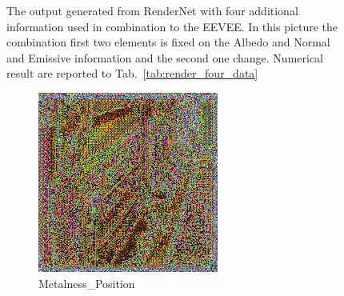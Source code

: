 \begin{figure}[h!]
    \caption{The output generated from RenderNet with four additional information used in combination to the EEVEE. In this picture the combination first two elements is fixed on the Albedo and Normal and Emissive information and the second one change. Numerical result are reported to Tab.~\ref{tab:render_four_data}}
    \label{fig:quadruple_input_base_albedo_normal}
\end{figure}

\begin{figure}[h!]
    \centering
    \begin{subfigure}[b]{0.175\textwidth}
     \includegraphics[width=\textwidth]{figures/result/quadruple/normal_emissive_metalness_position/1.png}
     \caption{Metalness_Position}\label{subfig:1}
    \end{subfigure}
    ~
    \begin{subfigure}[b]{0.175\textwidth}

\end{subfigure}
\end{figure}
